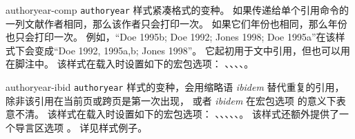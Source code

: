 \begin{marglist}
\item[authoryear-comp]
\texttt{authoryear} 样式紧凑格式的变种。
如果传递给单个引用命令的一列文献作者相同，那么该作者只会打印一次。
如果它们年份也相同，那么年份也只会打印一次。
例如，“Doe 1995b; Doe 1992; Jones 1998; Doe 1995a”在该样式下会变成“Doe 1992, 1995a,b; Jones 1998”。
它起初用于文中引用，但也可以用在脚注中。
该样式在载入时设置如下的宏包选项：
、、、、。

\item[authoryear-ibid]
\texttt{authoryear} 样式的变种，会用缩略语 \emph{ibidem} 替代重复的引用，
除非该引用在当前页或跨页是第一次出现，
或者 \emph{ibidem} 在宏包选项  的意义下表意不清。
该样式在载入时设置如下的宏包选项：
、、、、、。
该样式还额外提供了一个导言区选项 。
详见样式例子。


\end{marglist}

